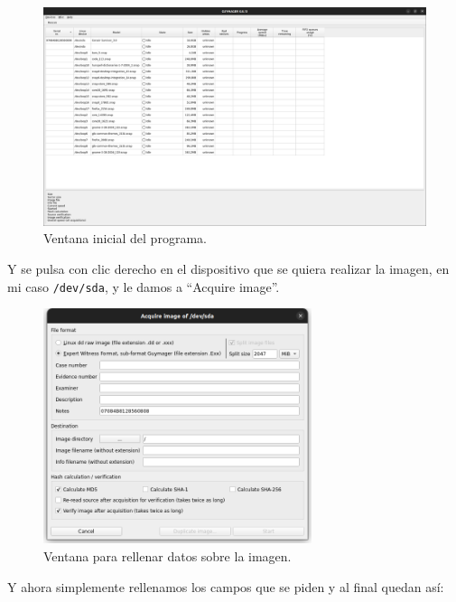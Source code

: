 \documentclass{article}
\begin{document}
\begin{figure}[H]
    \centering
    \includegraphics[width=\textwidth]{imagenes/Captura desde 2022-12-02 19-33-30.png}
    \caption{Ventana inicial del programa.}
\end{figure}

Y se pulsa con clic derecho en el dispositivo que se quiera realizar la imagen, en mi caso \verb|/dev/sda|, y le damos a ``Acquire image''.

\begin{figure}[H]
    \centering
    \includegraphics[width=0.7\textwidth]{imagenes/Captura desde 2022-12-02 19-33-37.png}
    \caption{Ventana para rellenar datos sobre la imagen.}
\end{figure}

\newpage

Y ahora simplemente rellenamos los campos que se piden y al final quedan así:
\end{document}
